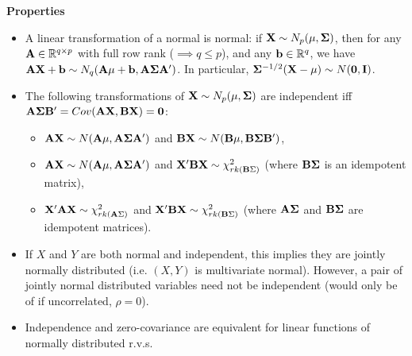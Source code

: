 \documentclass[DIV=14,titlepage=false]{scrreprt}
\begin{document}
\textbf{Properties}
\begin{itemize}
  \item A linear transformation of a normal is normal: if $ \mathbf{X} \sim N_p (\mathbf{\mu}, \mathbf{\Sigma}) $, then for any $ \mathbf{A} \in \mathbb{R}^{q \times p} $ with full row rank ($\implies q \leq p $), and any $ \mathbf{b} \in \mathbb{R}^q $, we have $ \mathbf{A} \mathbf{X} + \mathbf{b} \sim N_q (\mathbf{A} \mathbf{\mu} + \mathbf{b} , \mathbf{A} \mathbf{\Sigma} \mathbf{A}' ) $. In particular, $ \mathbf{\Sigma}^{-1/2} (\mathbf{X} - \mathbf{\mu}) \sim N (\mathbf{0}, \mathbf{I})$.
  \item The following transformations of $ \mathbf{X} \sim N_p (\mathbf{\mu}, \mathbf{\Sigma}) $ are independent iff $ \mathbf{A} \mathbf{\Sigma} \mathbf{B}' = Cov (\mathbf{A} \mathbf{X} , \mathbf{B} \mathbf{X}) = \mathbf{0} $:
  \begin{itemize}
  \item $ \mathbf{A} \mathbf{X} \sim N (\mathbf{A} \mathbf{\mu} , \mathbf{A} \mathbf{\Sigma} \mathbf{A}') $ and $ \mathbf{B} \mathbf{X} \sim N (\mathbf{B} \mathbf{\mu} , \mathbf{B} \mathbf{\Sigma} \mathbf{B}') $,
  \item $ \mathbf{A} \mathbf{X} \sim N (\mathbf{A} \mathbf{\mu} , \mathbf{A} \mathbf{\Sigma} \mathbf{A}') $ and $ \mathbf{X}' \mathbf{B} \mathbf{X} \sim \chi^2_{rk (\mathbf{B} \Sigma)} $ (where $ \mathbf{B} \mathbf{\Sigma} $ is an idempotent matrix),
  \item $ \mathbf{X}' \mathbf{A} \mathbf{X} \sim \chi^2_{rk (\mathbf{A} \Sigma)} $ and $ \mathbf{X}' \mathbf{B} \mathbf{X} \sim \chi^2_{rk (\mathbf{B} \Sigma)} $ (where $ \mathbf{A} \mathbf{\Sigma} $ and $ \mathbf{B} \mathbf{\Sigma} $ are idempotent matrices).
  \end{itemize}
  \item If $X$ and $Y$ are both normal and independent, this implies they are jointly normally distributed (i.e. $(X,Y)$ is multivariate normal). However, a pair of jointly normal distributed variables need not be independent (would only be of if uncorrelated, $\rho=0$).
  \item Independence and zero-covariance are equivalent for linear functions of normally distributed r.v.s.
\end{itemize}
\end{document}
